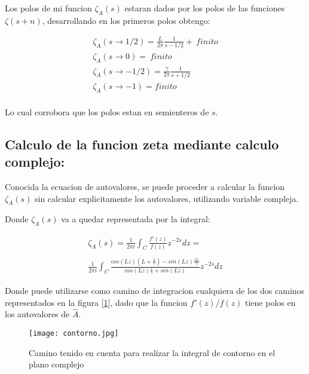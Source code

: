 Los polos de mi funcion $\zeta _A (s)$ estaran dados por los polos de las funciones $\zeta (s+n)$, desarrollando en los primeros polos obtengo:

\begin{equation}
\begin{array}{c}
\zeta _A (s \rightarrow 1/2) = 
\frac{L}{2 \pi } \frac{1}{s-1/2} + \ finito \\
\zeta _A (s \rightarrow 0) = \ finito \\
\zeta _A (s \rightarrow -1/2) = \frac{\gamma}{2 \pi} \frac{1}{s+1/2} \\
\zeta _A (s \rightarrow -1) = finito \\
\end{array}
\end{equation}

Lo cual corrobora que los polos estan en semienteros de $s$.

\subsection{Calculo de la funcion zeta mediante calculo complejo:}

Conocida la ecuacion de autovalores, se puede proceder a calcular la funcion $\zeta _A (s) $ sin calcular explicitamente los autovalores, utilizando variable compleja.

Donde $\zeta _A (s) $ va a quedar representada por la integral:

\begin{equation}
\begin{array}{c}
   \zeta _A (s) =  \frac{1}{2 \pi i} \int _{C} \frac{f'(z)}{f(z)} z ^{-2s} dz = \\ 
   \\ 
    \frac{1}{2 \pi i} \int _{C}
    \frac{ cos(L z) \left(L + \frac{1}{\gamma} \right) - sin(L z) \frac{z L}{\gamma}
    }
    {cos(L z) \frac{z}{\gamma} + sin(L z)
    }
    z ^{-2 s} dz
\end{array}
\end{equation}

Donde puede utilizarse como camino de integracion cualquiera de los dos caminos representados en la figura [\ref{fig:contorno}], dado que la funcion $f'(z) / f(z) $ tiene polos en los autovalores de $\hat{A}$.






\begin{figure}
\centering
\texttt{[image: contorno.jpg]}
\caption{Camino tenido en cuenta para realizar la integral de contorno en el plano complejo}
\label{fig:contorno}
\end{figure}


